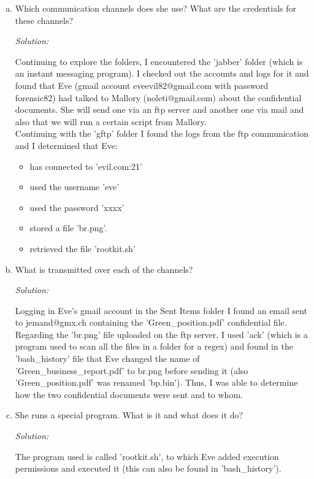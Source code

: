 \documentclass[a4paper,11pt]{article}
\newenvironment{solution}%
{\par{\noindent\small\textit{Solution:}}\vspace{-12pt}\begin{framed}}%
{\end{framed}\par}
\begin{document}
\begin{enumerate}[(a)]
\item Which communication channels does she use? What are the credentials for these channels?
\ifsolution\begin{solution}
Continuing to explore the folders, I encountered the 'jabber' folder (which is an instant messaging
program). I checked out the accounts and logs for it and found that Eve (gmail account eveevil82@gmail.com
with password forensic82) had talked to Mallory (noleti@gmail.com) about the confidential documents.
She will send one via an ftp server and another one via mail and also that we will run a certain script
from Mallory.\\
Continuing with the 'gftp' folder I found the logs from the ftp communication and I determined that Eve:
\begin{itemize}
  \item has connected to 'evil.com:21'
  \item used the username 'eve'
  \item used the password 'xxxx'
  \item stored a file 'br.png'.
  \item retrieved the file 'rootkit.sh'
\end{itemize}

\end{solution} 
\fi

\item What is transmitted over each of the channels?
\ifsolution\begin{solution}
Logging in Eve's gmail account in the Sent Items folder I found an email sent to jemand@gmx.ch containing
the 'Green\_position.pdf' confidential file.\\
Regarding the 'br.png' file uploaded on the ftp server, I used 'ack' (which is a program used to scan all the
files in a folder for a regex) and found in the 'bash\_history' file that Eve changed the name of 'Green\_business\_report.pdf' to
br.png before sending it (also 'Green\_position.pdf' was renamed 'bp.bin').
Thus, I was able to determine how the two confidential documents were sent and to whom.
\end{solution} 
\fi

\item She runs a special program. What is it and what does it do?
\ifsolution\begin{solution}
The program used is called 'rootkit.sh', to which Eve added execution permissions and executed it (this can
also be found in 'bash\_history').
\end{solution} 
\fi

\end{enumerate}
\end{document}
